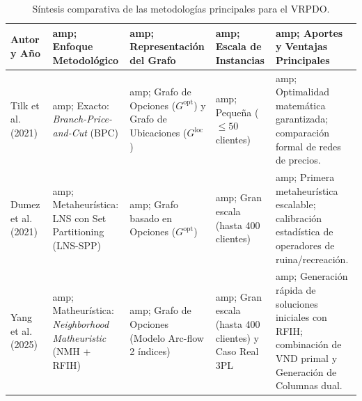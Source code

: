 \documentclass[letter, 10pt]{article}
\begin{document}
\begin{table}[htbp] \centering \small 
    \caption{Síntesis comparativa de las metodologías principales para el VRPDO.} 
    \label{tab:sintesis_estado_arte} 
        \begin{tabular}{|p{2.8cm}|p{2.6cm}|p{2.6cm}|p{2.5cm}|p{3.5cm}|} \hline
        \textbf{Autor y Año} &amp; \textbf{Enfoque Metodológico} &amp; \textbf{Representación del Grafo} &amp; \textbf{Escala de Instancias} &amp; \textbf{Aportes y Ventajas Principales} \\ \hline 
        Tilk et al. (2021)~\cite{Tilk21LastMile} &amp; Exacto: \emph{Branch-Price-and-Cut} (BPC) &amp; Grafo de Opciones ($G^{\text{opt}}$) y Grafo de Ubicaciones ($G^{\text{loc}}$) &amp; Pequeña ($\le 50$ clientes) &amp; Optimalidad matemática garantizada; comparación formal de redes de precios. \\ \hline 
        Dumez et al. (2021)~\cite{Dumez21Large} &amp; Metaheurística: LNS con Set Partitioning (LNS-SPP) &amp; Grafo basado en Opciones ($G^{\text{opt}}$) &amp; Gran escala (hasta 400 clientes) &amp; Primera metaheurística escalable; calibración estadística de operadores de ruina/recreación. \\ \hline 
        Yang et al. (2025)~\cite{Yang25Neighborhood} &amp; Matheurística: \emph{Neighborhood Matheuristic} (NMH + RFIH) &amp; Grafo de Opciones (Modelo Arc-flow 2 índices) &amp; Gran escala (hasta 400 clientes) y Caso Real 3PL &amp; Generación rápida de soluciones iniciales con RFIH; combinación de VND primal y Generación de Columnas dual. \\ \hline 
        \end{tabular} 
\end{table} 
\end{document}
